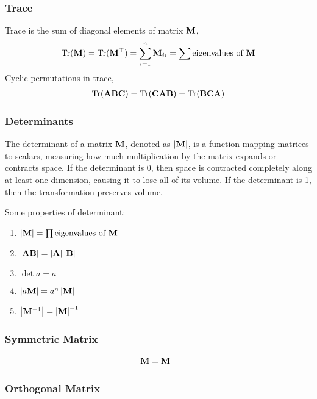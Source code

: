 \subsubsection*{Trace}

Trace is the sum of diagonal elements of matrix $\mathbf{M}$,
\begin{align*}
	\Tr(\mat{M})=\Tr(\mat{M}\T)=\sum_{i=1}^n\mat{M}_{ii}=\sum\text{eigenvalues of $\mat{M}$}
\end{align*}
Cyclic permutations in trace,
\begin{align*}
	\Tr(\mat{A}\mat{B}\mat{C})=\Tr(\mat{C}\mat{A}\mat{B})=\Tr(\mat{B}\mat{C}\mat{A})
\end{align*}

\subsubsection*{Determinants}

The determinant of a matrix $\mathbf{M}$, denoted as $\left\vert \mathbf{M} \right\vert$, is a function mapping matrices to scalars, measuring how much multiplication by the matrix expands or contracts space. If the determinant is 0, then space is contracted completely along at least one dimension, causing it to lose all of its volume. If the determinant is 1, then the transformation preserves volume.

Some properties of determinant:
\begin{enumerate}
	\item $\left\vert \mathbf{M} \right\vert=\prod\text{eigenvalues of $\mathbf{M}$}$
	\item $\left\vert \mathbf{A}\mathbf{B} \right\vert=\left\vert \mathbf{A} \right\vert\left\vert \mathbf{B} \right\vert$
	\item $\det{a}=a$
	\item $\left\vert a\mathbf{M} \right\vert=a^n\left\vert \mathbf{M} \right\vert$
	\item $\left\vert \mathbf{M}^{-1} \right\vert=\left\vert \mathbf{M} \right\vert^{-1}$
\end{enumerate}

\subsubsection*{Symmetric Matrix}

\begin{align*}
	\mathbf{M}=\mathbf{M}{}^\top
\end{align*}

\subsubsection*{Orthogonal Matrix}

